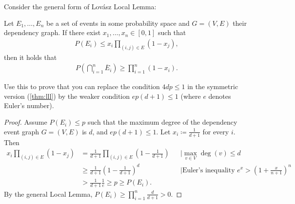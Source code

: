 \begin{aufgabe}
	Consider the general form of Lovász Local Lemma:
	\begin{theorem}
		Let $E_1, \dots, E_n$ be a set of events in some probability space and $G=(V,E)$ their dependency graph.
		If there exist $x_1, \dots, x_n \in [0,1]$ such that
		\begin{align*}
			P(E_i) \leq x_i \prod_{(i,j)\in E}(1-x_j),
		\end{align*}
		then it holds that
		\begin{align*}
			P\left(\bigcap_{i=1}^n \overline{E}_i\right) \geq \prod_{i=1}^{n}(1-x_i).
		\end{align*}
	\end{theorem}
	Use this to prove that you can replace the condition $4dp \leq 1$ in the symmetric version (\autoref{thm:lll}) by the weaker condition $ep(d+1)\leq 1$ (where $e$ denotes Euler's number).
	\begin{proof}
		Assume $P(E_i) \leq p$ such that the maximum degree of the dependency event graph $G=(V,E)$ is $d$, and $ep(d+1) \leq 1$.
		Let $x_i \coloneqq \frac{1}{d+1}$ for every $i$. Then
		\begin{align*}
			x_i \prod_{(i,j)\in E}(1-x_j) & = \frac{1}{d+1}\prod_{(i,j)\in E}\left(1-\frac{1}{d+1}\right) &  & \mid \max_{v\in V} \deg(v) \leq d                                      \\
			                              & \geq \frac{1}{d+1}\left(1-\frac{1}{d+1}\right)^d              &  & \mid \text{Euler's inequality } e^x > \left(1 + \frac{x}{n+1}\right)^n \\
			                              & >  \frac{1}{d+1} \frac{1}{e} \geq p \geq P(E_i).
		\end{align*}
		By the general Local Lemma, $P(E_i) \geq \prod_{i=1}^{n}\frac{d}{d+1} > 0$.
	\end{proof}
\end{aufgabe}

